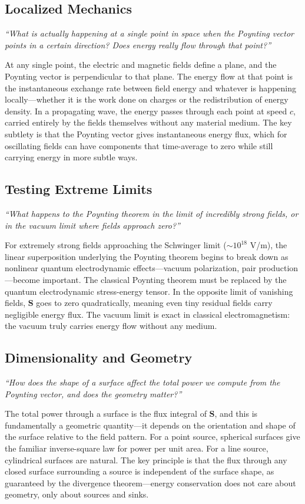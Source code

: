 \subsection*{Localized Mechanics}
\textit{``What is actually happening at a single point in space when the Poynting vector points in a certain direction? Does energy really flow through that point?''}

At any single point, the electric and magnetic fields define a plane, and the Poynting vector is perpendicular to that plane. The energy flow at that point is the instantaneous exchange rate between field energy and whatever is happening locally---whether it is the work done on charges or the redistribution of energy density. In a propagating wave, the energy passes through each point at speed $c$, carried entirely by the fields themselves without any material medium. The key subtlety is that the Poynting vector gives instantaneous energy flux, which for oscillating fields can have components that time-average to zero while still carrying energy in more subtle ways.

\subsection*{Testing Extreme Limits}
\textit{``What happens to the Poynting theorem in the limit of incredibly strong fields, or in the vacuum limit where fields approach zero?''}

For extremely strong fields approaching the Schwinger limit ($\sim 10^{18}$ V/m), the linear superposition underlying the Poynting theorem begins to break down as nonlinear quantum electrodynamic effects---vacuum polarization, pair production---become important. The classical Poynting theorem must be replaced by the quantum electrodynamic stress-energy tensor. In the opposite limit of vanishing fields, $\mathbf{S}$ goes to zero quadratically, meaning even tiny residual fields carry negligible energy flux. The vacuum limit is exact in classical electromagnetism: the vacuum truly carries energy flow without any medium.

\subsection*{Dimensionality and Geometry}
\textit{``How does the shape of a surface affect the total power we compute from the Poynting vector, and does the geometry matter?''}

The total power through a surface is the flux integral of $\mathbf{S}$, and this is fundamentally a geometric quantity---it depends on the orientation and shape of the surface relative to the field pattern. For a point source, spherical surfaces give the familiar inverse-square law for power per unit area. For a line source, cylindrical surfaces are natural. The key principle is that the flux through any closed surface surrounding a source is independent of the surface shape, as guaranteed by the divergence theorem---energy conservation does not care about geometry, only about sources and sinks.

